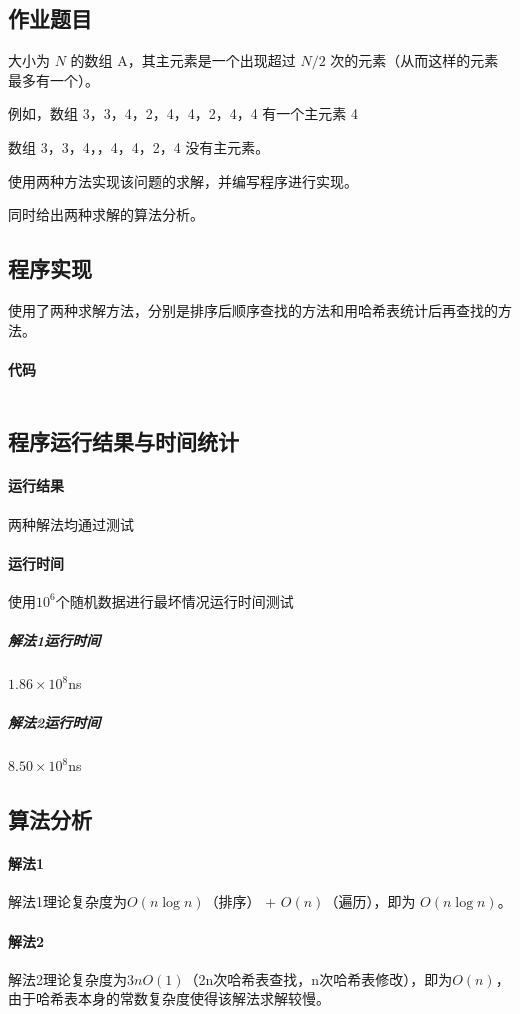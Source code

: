 \documentclass[UTF8]{ctexart}
\begin{document}
    \subsection{作业题目}
      大小为 $N$ 的数组 A，其主元素是一个出现超过 $N/2$ 次的元素（从而这样的元素最多有一个）。

      例如，数组 3，3，4，2，4，4，2，4，4 有一个主元素 4

      数组 3，3，4，，4，4，2，4 没有主元素。

      使用两种方法实现该问题的求解，并编写程序进行实现。

      同时给出两种求解的算法分析。

    \subsection{程序实现}
      使用了两种求解方法，分别是排序后顺序查找的方法和用哈希表统计后再查找的方法。
      \paragraph{代码}
      \inputminted{java}{src/Problem4.java}

    \subsection{程序运行结果与时间统计}
      \paragraph{运行结果} 两种解法均通过测试
      \paragraph{运行时间} 使用$10 ^ 6$个随机数据进行最坏情况运行时间测试
        \subparagraph{解法1运行时间} $1.86 \times 10 ^ 8$ns
        \subparagraph{解法2运行时间} $8.50 \times 10 ^ 8$ns

    \subsection{算法分析}
      \paragraph{解法1}
        解法1理论复杂度为$O(n\log n)$（排序） + $O(n)$（遍历），即为 $O(n\log n)$。
      \paragraph{解法2}
        解法2理论复杂度为$3nO(1)$（2n次哈希表查找，n次哈希表修改），即为$O(n)$，由于哈希表本身的常数复杂度使得该解法求解较慢。
\end{document}

